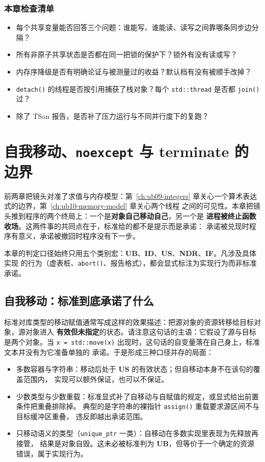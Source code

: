 \documentclass[12pt,a4paper,fontset=fandol]{ctexbook}
\newcommand{\Fn}[1]{\texttt{#1()}}
\newcommand{\Tp}[1]{\texttt{#1}}
\newcommand{\UB}{\textbf{\textsf{UB}}}
\newcommand{\IDB}{\textbf{\textsf{ID}}}
\newcommand{\USB}{\textbf{\textsf{US}}}
\newcommand{\NDR}{\textbf{\textsf{NDR}}}
\newcommand{\ILLF}{\textbf{\textsf{IF}}}
\begin{document}
\subsection{本章检查清单}\label{sec:ub10-checklist}

\begin{itemize}
  \item 每个共享变量能否回答三个问题：谁能写、谁能读、读写之间靠哪条同步边分隔？
  \item 所有非原子共享状态是否都在同一把锁的保护下？锁外有没有读或写？
  \item 内存序降级是否有明确论证与被测量过的收益？默认档有没有被顺手改掉？
  \item \Fn{detach} 的线程是否按引用捕获了栈对象？每个 \Tp{std::thread} 是否都 \Fn{join} 过？
  \item 除了 TSan 报告，是否补了压力运行与不同并行度下的复跑？
\end{itemize}

\chapter{自我移动、\Tp{noexcept} 与 terminate 的边界}\label{ch:ub11-terminate}

前两章把镜头对准了求值与内存模型：第~\ref{ch:ub09-integers} 章关心一个算术表达式的边界，第~\ref{ch:ub10-memory-model} 章关心两个线程
之间的可见性。本章把镜头推到程序的两个终局上：一个是\textbf{对象自己移动自己}，另一个是
\textbf{进程被终止函数收场}。这两件事的共同点在于，标准给的都不是提示而是承诺：
承诺被兑现时程序有意义，承诺被撤回时程序没有下一步。

本章的判定口径始终只用五个类别宏：\UB{}、\IDB{}、\USB{}、\NDR{}、\ILLF{}。凡涉及具体实现
的行为（虚表桩、\Fn{abort}、报告格式），都会显式标注为实现行为而非标准承诺。

\section{自我移动：标准到底承诺了什么}\label{sec:ub11-selfmove}

标准对库类型的移动赋值通常写成这样的效果描述：把源对象的资源转移给目标对象，源对象进入
\textbf{有效但未指定}的状态。请注意这句话的主语：它假设了源与目标是两个对象。当
\Tp{x = std::move(x)} 出现时，这句话的自变量落在自己身上，标准文本并没有为它准备单独的
承诺。于是形成三种口径并存的局面：

\begin{itemize}
  \item 多数容器与字符串：移动后处于 \USB{} 的有效状态；但自移动本身不在该句的覆盖范围内，
        实现可以额外保证，也可以不保证。
  \item 少数类型与少数重载：标准显式补了自移动与自赋值的规定，或显式给出前置条件把重叠排除掉。
        典型的是字符串的裸指针 \Fn{assign} 重载要求源区间不与目标缓冲区重叠，
        违反即越出承诺范围。
  \item 只移动语义的类型（\Tp{unique\_ptr} 一类）：自移动在多数实现里表现为先释放再接管，
        结果是对象自毁。这未必被标准判为 \UB{}，但等价于一个确定的资源错误，属于实现行为。
\end{itemize}
\end{document}
